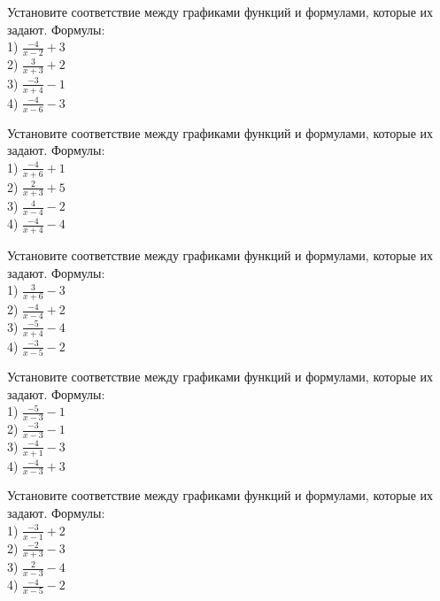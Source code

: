 \documentclass[4apaper]{article}
\begin{document}
\begin{taskBN}{81}
Установите соответствие между графиками функций и формулами, которые их задают. Формулы: \\1) $\frac{-4}{x-2}+3$\\2) $\frac{3}{x+3}+2$\\3) $\frac{-3}{x+4}-1$\\4) $\frac{-4}{x-6}-3$
\end{taskBN}

\begin{taskBN}{82}
Установите соответствие между графиками функций и формулами, которые их задают. Формулы: \\1) $\frac{-4}{x+6}+1$\\2) $\frac{2}{x+3}+5$\\3) $\frac{4}{x-4}-2$\\4) $\frac{-4}{x+4}-4$
\end{taskBN}

\begin{taskBN}{83}
Установите соответствие между графиками функций и формулами, которые их задают. Формулы: \\1) $\frac{3}{x+6}-3$\\2) $\frac{-4}{x-4}+2$\\3) $\frac{-5}{x+4}-4$\\4) $\frac{-3}{x-5}-2$
\end{taskBN}

\begin{taskBN}{84}
Установите соответствие между графиками функций и формулами, которые их задают. Формулы: \\1) $\frac{-5}{x-3}-1$\\2) $\frac{-3}{x-3}-1$\\3) $\frac{-4}{x+1}-3$\\4) $\frac{-4}{x-3}+3$
\end{taskBN}

\begin{taskBN}{85}
Установите соответствие между графиками функций и формулами, которые их задают. Формулы: \\1) $\frac{-3}{x-1}+2$\\2) $\frac{-2}{x+3}-3$\\3) $\frac{2}{x-3}-4$\\4) $\frac{-4}{x-5}-2$
\end{taskBN}
\end{document}
